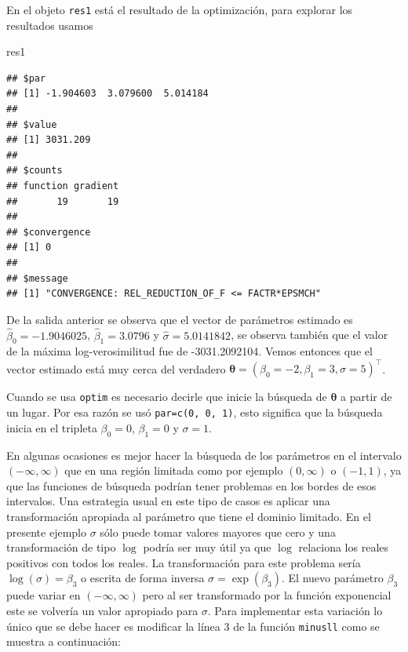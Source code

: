\documentclass[
]{book}
\makeatletter
\newenvironment{Shaded}{\begin{snugshade}}{\end{snugshade}}
\newcommand{\NormalTok}[1]{#1}
\newenvironment{kframe}{%
\medskip{}
\setlength{\fboxsep}{.8em}
 \def\at@end@of@kframe{}%
 \ifinner\ifhmode%
  \def\at@end@of@kframe{\end{minipage}}%
  \begin{minipage}{\columnwidth}%
 \fi\fi%
 \def\FrameCommand##1{\hskip\@totalleftmargin \hskip-\fboxsep
 \colorbox{shadecolor}{##1}\hskip-\fboxsep
     \hskip-\linewidth \hskip-\@totalleftmargin \hskip\columnwidth}%
 \MakeFramed {\advance\hsize-\width
   \@totalleftmargin\z@ \linewidth\hsize
   \@setminipage}}%
 {\par\unskip\endMakeFramed%
 \at@end@of@kframe}
\renewenvironment{Shaded}{\begin{kframe}}{\end{kframe}}
\newenvironment{rmdblock}[1]
  {
  \begin{itemize}
  \renewcommand{\labelitemi}{
    \raisebox{-.7\height}[0pt][0pt]{
      {\setkeys{Gin}{width=3em,keepaspectratio}\texttt{[image: images/\#1]}}
    }
  }
  \setlength{\fboxsep}{1em}
  \begin{kframe}
  \item
  }
  {
  \end{kframe}
  \end{itemize}
  }
\newenvironment{rmdnote}
  {\begin{rmdblock}{note}}
  {\end{rmdblock}}
\makeatother
\begin{document}
En el objeto \texttt{res1} está el resultado de la optimización, para explorar los resultados usamos

\begin{Shaded}
\begin{Highlighting}[]
\NormalTok{res1}
\end{Highlighting}
\end{Shaded}

\begin{verbatim}
## $par
## [1] -1.904603  3.079600  5.014184
## 
## $value
## [1] 3031.209
## 
## $counts
## function gradient 
##       19       19 
## 
## $convergence
## [1] 0
## 
## $message
## [1] "CONVERGENCE: REL_REDUCTION_OF_F <= FACTR*EPSMCH"
\end{verbatim}

De la salida anterior se observa que el vector de parámetros estimado es \(\hat{\beta}_0 = -1.9046025\), \(\hat{\beta}_1 = 3.0796\) y \(\hat{\sigma} = 5.0141842\), se observa también que el valor de la máxima log-verosimilitud fue de -3031.2092104. Vemos entonces que el vector estimado está muy cerca del verdadero \(\boldsymbol{\theta}=(\beta_0=-2, \beta_1=3, \sigma=5)^\top\).

\begin{rmdnote}
Cuando se usa \texttt{optim} es necesario decirle que inicie la búsqueda de \(\boldsymbol{\theta}\) a partir de un lugar. Por esa razón se usó \texttt{par=c(0,\ 0,\ 1)}, esto significa que la búsqueda inicia en el tripleta \(\beta_0=0\), \(\beta_1=0\) y \(\sigma=1\).
\end{rmdnote}

En algunas ocasiones es mejor hacer la búsqueda de los parámetros en el intervalo \((-\infty, \infty)\) que en una región limitada como por ejemplo \((0, \infty)\) o \((-1, 1)\), ya que las funciones de búsqueda podrían tener problemas en los bordes de esos intervalos. Una estrategia usual en este tipo de casos es aplicar una transformación apropiada al parámetro que tiene el dominio limitado. En el presente ejemplo \(\sigma\) sólo puede tomar valores mayores que cero y una transformación de tipo \(\log\) podría ser muy útil ya que \(\log\) relaciona los reales positivos con todos los reales. La transformación para este problema sería \(\log(\sigma)=\beta_3\) o escrita de forma inversa \(\sigma=\exp(\beta_3)\). El nuevo parámetro \(\beta_3\) puede variar en \((-\infty, \infty)\) pero al ser transformado por la función exponencial este se volvería un valor apropiado para \(\sigma\). Para implementar esta variación lo único que se debe hacer es modificar la línea 3 de la función \texttt{minusll} como se muestra a continuación:
\end{document}
